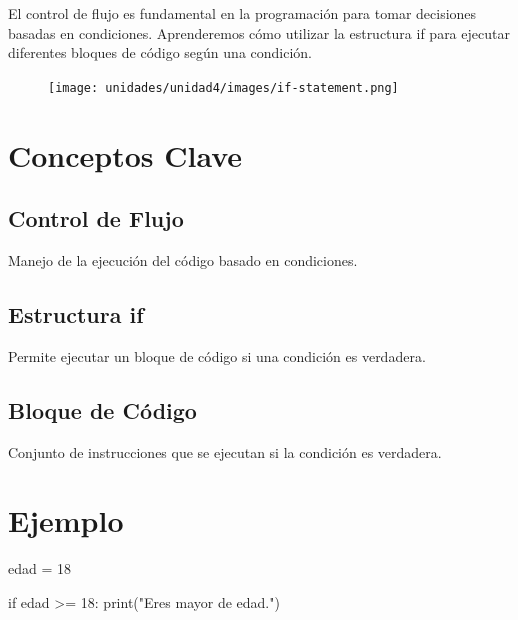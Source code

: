 \documentclass[
  a4paper,
  DIV=11,
  numbers=noendperiod,
  onepage,
  openany]{scrreprt}
\newenvironment{Shaded}{\begin{snugshade}}{\end{snugshade}}
\newcommand{\BuiltInTok}[1]{\textcolor[rgb]{0.00,0.23,0.31}{#1}}
\newcommand{\ControlFlowTok}[1]{\textcolor[rgb]{0.00,0.23,0.31}{#1}}
\newcommand{\DecValTok}[1]{\textcolor[rgb]{0.68,0.00,0.00}{#1}}
\newcommand{\NormalTok}[1]{\textcolor[rgb]{0.00,0.23,0.31}{#1}}
\newcommand{\OperatorTok}[1]{\textcolor[rgb]{0.37,0.37,0.37}{#1}}
\newcommand{\StringTok}[1]{\textcolor[rgb]{0.13,0.47,0.30}{#1}}
\begin{document}
El control de flujo es fundamental en la programación para tomar
decisiones basadas en condiciones. Aprenderemos cómo utilizar la
estructura if para ejecutar diferentes bloques de código según una
condición.

\begin{figure}

{\centering \texttt{[image: unidades/unidad4/images/if-statement.png]}

}

\end{figure}

\section{Conceptos Clave}\label{conceptos-clave-12}

\subsection{Control de Flujo}\label{control-de-flujo}

Manejo de la ejecución del código basado en condiciones.

\subsection{Estructura if}\label{estructura-if}

Permite ejecutar un bloque de código si una condición es verdadera.

\subsection{Bloque de Código}\label{bloque-de-cuxf3digo}

Conjunto de instrucciones que se ejecutan si la condición es verdadera.

\section{Ejemplo}\label{ejemplo-7}

\begin{Shaded}
\begin{Highlighting}[]
\NormalTok{edad }\OperatorTok{=} \DecValTok{18}

\ControlFlowTok{if}\NormalTok{ edad }\OperatorTok{\textgreater{}=} \DecValTok{18}\NormalTok{:}
    \BuiltInTok{print}\NormalTok{(}\StringTok{"Eres mayor de edad."}\NormalTok{)}
\end{Highlighting}
\end{Shaded}
\end{document}
